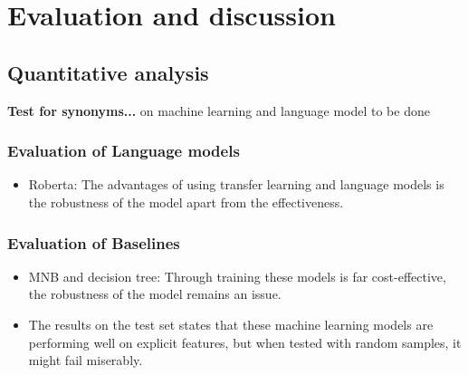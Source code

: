 \chapter{Evaluation and discussion}

\section{Quantitative analysis}
\textbf{Test for synonyms...} on machine learning and language model to be done

\subsection{Evaluation of Language models}
\begin{itemize}
    \item Roberta: The advantages of using transfer learning and language models is the robustness of the model apart from the effectiveness.
\end{itemize}
\subsection{Evaluation of Baselines}
\begin{itemize}
    \item MNB and decision tree: Through training these models is far cost-effective, the robustness of the model remains an issue. 
    \item The results on the test set states that these machine learning models are performing well on explicit features, but when tested with random samples, it might fail miserably. 
\end{itemize}


